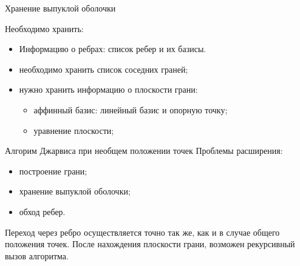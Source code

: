 \documentclass[]{beamer} %
\begin{document}
\begin{frame}{Хранение выпуклой оболочки}

    Необходимо хранить:
    \begin{itemize}
        \item Информацию о ребрах: список ребер и их базисы.
        \item необходимо хранить список соседних граней;
        \item нужно хранить информацию о плоскости грани:
        \begin{itemize}
            \item аффинный базис: линейный базис и опорную точку;
            \item уравнение плоскости;
        \end{itemize}
    \end{itemize}





\end{frame}



\begin{frame}{Алгорим Джарвиса при необщем положении точек}
       Проблемы расширения:
          \begin{itemize}
            \item  построение грани;
           \item  хранение выпуклой оболочки;
           \item  обход ребер.
           \end{itemize}

           Переход через ребро осуществляется точно так же, как и в случае общего положения точек. После нахождения плоскости грани, возможен рекурсивный вызов алгоритма.
\end{frame}
\end{document}
